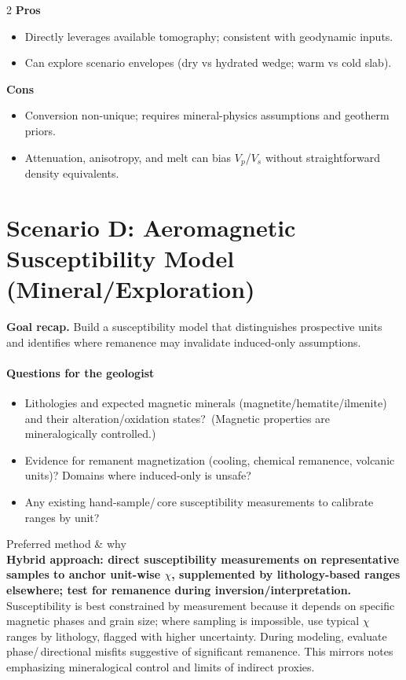 \documentclass[11pt,a4paper]{article}
\begin{document}
\begin{multicols}{2}
\textbf{Pros}
\begin{itemize}[leftmargin=*]
  \item Directly leverages available tomography; consistent with geodynamic inputs.\label{notesref}
  \item Can explore scenario envelopes (dry vs hydrated wedge; warm vs cold slab).
\end{itemize}
\columnbreak
\textbf{Cons}
\begin{itemize}[leftmargin=*]
  \item Conversion non-unique; requires mineral-physics assumptions and geotherm priors.\label{notesref}
  \item Attenuation, anisotropy, and melt can bias $V_p$/$V_s$ without straightforward density equivalents.
\end{itemize}
\end{multicols}

\section*{Scenario D: Aeromagnetic Susceptibility Model (Mineral/Exploration)}
\textbf{Goal recap.} Build a susceptibility model that distinguishes prospective units and identifies where remanence may invalidate induced-only assumptions.

\paragraph{Questions for the geologist}
\begin{itemize}[leftmargin=*]
  \item Lithologies and expected magnetic minerals (magnetite/hematite/ilmenite) and their alteration/oxidation states?~(Magnetic properties are mineralogically controlled.)\label{notesref}
  \item Evidence for remanent magnetization (cooling, chemical remanence, volcanic units)? Domains where induced-only is unsafe?
  \item Any existing hand-sample/\,core susceptibility measurements to calibrate ranges by unit?
\end{itemize}

Preferred method \& why\\
\textbf{Hybrid approach: direct susceptibility measurements on representative samples to anchor unit-wise $\chi$, supplemented by lithology-based ranges elsewhere; test for remanence during inversion/interpretation.} Susceptibility is best constrained by measurement because it depends on specific magnetic phases and grain size; where sampling is impossible, use typical $\chi$ ranges by lithology, flagged with higher uncertainty. During modeling, evaluate phase/\,directional misfits suggestive of significant remanence. This mirrors notes emphasizing mineralogical control and limits of indirect proxies.\label{notesref}
\end{document}
